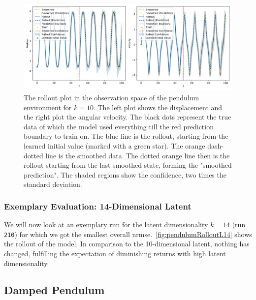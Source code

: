 			\begin{figure}[H]
				\centering
				\includegraphics[width=\linewidth]{figures/results/pendulum/run-latent-dim-10/rollout-observations-N0.pdf}
				\caption[Rollout of the pendulum experiment for 10 latent dimensions]{The rollout plot in the observation space of the pendulum environment for \(k = 10\). The left plot shows the displacement and the right plot the angular velocity. The black dots represent the true data of which the model used everything till the red prediction boundary to train on. The blue line is the rollout, starting from the learned initial value (marked with a green star). The orange dash-dotted line is the smoothed data. The dotted orange line then is the rollout starting from the last smoothed state, forming the "smoothed prediction". The shaded regions show the confidence, \ie two times the standard deviation.}
				\label{fig:pendulumRolloutL10}
			\end{figure}

		\subsubsection{Exemplary Evaluation: 14-Dimensional Latent}
			\label{subsubsec:pendulumL14}

			We will now look at an exemplary run for the latent dimensionality \( k = 14 \) (run \texttt{210}) for which we got the smallest overall \ac{nrmse}.~\autoref{fig:pendulumRolloutL14} shows the rollout of the model. In comparison to the 10-dimensional latent, nothing has changed, fulfilling the expectation of diminishing returns with high latent dimensionality.

	\subsection{Damped Pendulum} %

